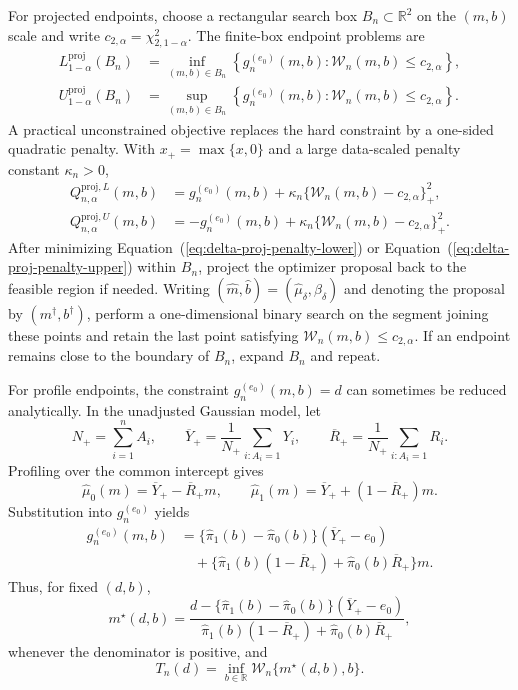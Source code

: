 \documentclass[11pt]{article}
\begin{document}
For projected endpoints, choose a rectangular search box $B_n\subset\mathbb{R}^2$ on the $(m,b)$ scale and write $c_{2,\alpha}=\chi^2_{2,1-\alpha}$. The finite-box endpoint problems are
\begin{align*}
  L^{\mathrm{proj}}_{1-\alpha}(B_n)
  &=
  \inf_{(m,b)\in B_n}
  \left\{
    g_n^{(e_0)}(m,b):
    \mathcal{W}_n(m,b)\leq c_{2,\alpha}
  \right\},\\
  U^{\mathrm{proj}}_{1-\alpha}(B_n)
  &=
  \sup_{(m,b)\in B_n}
  \left\{
    g_n^{(e_0)}(m,b):
    \mathcal{W}_n(m,b)\leq c_{2,\alpha}
  \right\}.
\end{align*}
A practical unconstrained objective replaces the hard constraint by a one-sided quadratic penalty. With $x_+=\max\{x,0\}$ and a large data-scaled penalty constant $\kappa_n>0$,
\begin{align}
  Q^{\mathrm{proj},L}_{n,\alpha}(m,b)
  &=
  g_n^{(e_0)}(m,b)
  +
  \kappa_n\{\mathcal{W}_n(m,b)-c_{2,\alpha}\}_+^2,
  \label{eq:delta-proj-penalty-lower}\\
  Q^{\mathrm{proj},U}_{n,\alpha}(m,b)
  &=
  -g_n^{(e_0)}(m,b)
  +
  \kappa_n\{\mathcal{W}_n(m,b)-c_{2,\alpha}\}_+^2.
  \label{eq:delta-proj-penalty-upper}
\end{align}
After minimizing Equation~(\ref{eq:delta-proj-penalty-lower}) or Equation~(\ref{eq:delta-proj-penalty-upper}) within $B_n$, project the optimizer proposal back to the feasible region if needed. Writing $(\widehat{m},\widehat{b})=(\widehat{\mu}_\delta,\widehat{\beta}_\delta)$ and denoting the proposal by $(m^\dagger,b^\dagger)$, perform a one-dimensional binary search on the segment joining these points and retain the last point satisfying $\mathcal{W}_n(m,b)\leq c_{2,\alpha}$. If an endpoint remains close to the boundary of $B_n$, expand $B_n$ and repeat.

For profile endpoints, the constraint $g_n^{(e_0)}(m,b)=d$ can sometimes be reduced analytically. In the unadjusted Gaussian model, let
\[
  N_+=\sum_{i=1}^n A_i,
  \qquad
  \overline{Y}_+
  =
  \frac{1}{N_+}\sum_{i:A_i=1}Y_i,
  \qquad
  \overline{R}_+
  =
  \frac{1}{N_+}\sum_{i:A_i=1}R_i.
\]
Profiling over the common intercept gives
\[
  \widehat{\mu}_0(m)=\overline{Y}_+-\overline{R}_+m,
  \qquad
  \widehat{\mu}_1(m)=\overline{Y}_++(1-\overline{R}_+)m.
\]
Substitution into $g_n^{(e_0)}$ yields
\begin{align*}
  g_n^{(e_0)}(m,b)
  &=
  \{\widehat{\pi}_1(b)-\widehat{\pi}_0(b)\}
  (\overline{Y}_+-e_0)\\
  &\quad+
  \{\widehat{\pi}_1(b)(1-\overline{R}_+)
    +\widehat{\pi}_0(b)\overline{R}_+\}m.
\end{align*}
Thus, for fixed $(d,b)$,
\[
  m^\star(d,b)
  =
  \frac{
    d-\{\widehat{\pi}_1(b)-\widehat{\pi}_0(b)\}
    (\overline{Y}_+-e_0)
  }{
    \widehat{\pi}_1(b)(1-\overline{R}_+)
    +\widehat{\pi}_0(b)\overline{R}_+
  },
\]
whenever the denominator is positive, and
\[
  T_n(d)
  =
  \inf_{b\in\mathbb{R}}
  \mathcal{W}_n\{m^\star(d,b),b\}.
\]
\end{document}

